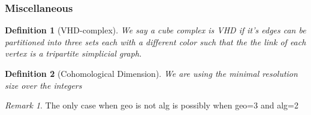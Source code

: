 \documentclass{article}
\theoremstyle{mystyle}
\newtheorem{defn}{Definition}
\theoremstyle{remark}
\newtheorem{rmk}{Remark}[section]
\begin{document}
\subsubsection{Miscellaneous}


\begin{defn}
    [VHD-complex]
    \label{defn:vhd} 
    We say a cube complex is VHD if it's edges can be partitioned into three sets each with a different color such that the the link of each vertex is a tripartite simplicial graph.
\end{defn}
\begin{defn}
    [Cohomological Dimension]
    \label{defn:cd} 
    We are using the minimal resolution size over the integers
\end{defn}

\begin{rmk}
    The only case when geo is not alg is possibly when geo=3 and alg=2
\end{rmk}
 
\end{document}
